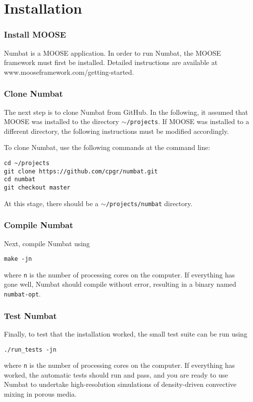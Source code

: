 \documentclass[11pt, a4paper]{csiroreport2012}
\begin{document}
\section{Installation}



\subsubsection*{Install MOOSE}
 Numbat is  a MOOSE application. In order to run Numbat, the MOOSE framework must first be installed. Detailed instructions are available at www.mooseframework.com/getting-started.

 \subsubsection*{Clone Numbat}

 The next step is to clone Numbat from GitHub. In the following, it assumed that MOOSE was installed to the directory \texttt{$\sim$/projects}. If MOOSE was installed to a different directory, the following instructions must be modified accordingly.

To clone Numbat, use the following commands at the command line:

\begin{verbatim}
cd ~/projects
git clone https://github.com/cpgr/numbat.git
cd numbat
git checkout master
\end{verbatim}

At this stage, there should be a \texttt{$\sim$/projects/numbat} directory.

\subsubsection*{Compile Numbat}
Next, compile Numbat using
\begin{verbatim}
make -jn
\end{verbatim}
where \texttt{n} is the number of processing cores on the computer. If everything has gone well, Numbat should compile without error, resulting in a binary named \texttt{numbat-opt}.

\subsubsection*{Test Numbat}
Finally, to test that the installation worked, the small test suite can be run using
\begin{verbatim}
./run_tests -jn
\end{verbatim}
where \texttt{n} is the number of processing cores on the computer. If everything has worked, the automatic tests should run and pass, and you are ready to use Numbat to undertake high-resolution simulations of density-driven convective mixing in porous media.
\end{document}
